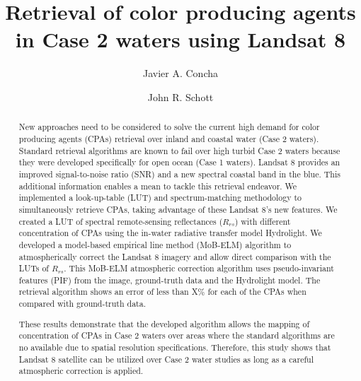 \documentclass[onecolumn,3p]{elsarticle}
\begin{document}
\linenumbers
\begin{frontmatter}

\title{Retrieval of color producing agents in Case 2 waters using Landsat 8}


\author[mymainaddress]{Javier A. Concha}

\author[mymainaddress]{John R. Schott}



\address[mymainaddress]{Rochester Institute of Technology, NY 14623, USA
}


\begin{abstract}

New approaches need to be considered to solve the current high demand for color producing agents (CPAs) retrieval over inland and coastal water (Case 2 waters). 
%
Standard retrieval algorithms are known to fail over high turbid Case 2 waters because they were developed specifically for open ocean (Case 1 waters). 
%
Landsat 8 provides an improved signal-to-noise ratio (SNR) and a new spectral coastal band in the blue. 
%
This additional information enables a mean to tackle this retrieval endeavor. 
We implemented a look-up-table (LUT) and spectrum-matching methodology to simultaneously retrieve CPAs, taking advantage of these Landsat 8's new features. 
%
We created a LUT of spectral remote-sensing reflectances ($R_{rs}$) with different concentration of CPAs using the in-water radiative transfer model Hydrolight. 
%
We developed a model-based empirical line method (MoB-ELM) algorithm to atmospherically correct the Landsat 8 imagery and allow direct comparison with the LUTs of $R_{rs}$. 
%
This  MoB-ELM atmospheric correction algorithm uses pseudo-invariant features (PIF) from the image, ground-truth data and the Hydrolight model.
The retrieval algorithm shows an error of less than X\% for each of the CPAs when compared with ground-truth data. 

These results demonstrate that the developed algorithm allows the mapping of concentration of CPAs in Case 2 waters over areas where the standard algorithms are no available due to spatial resolution specifications.
%
Therefore, this study shows that Landsat 8 satellite can be utilized over Case 2 water studies as long as a careful atmospheric correction is applied. 


\end{abstract}
\end{frontmatter}
\end{document}
